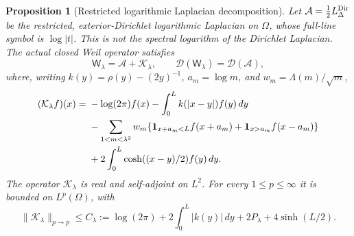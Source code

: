 \documentclass[11pt]{article}
\newtheorem{proposition}[theorem]{Proposition}
\theoremstyle{remark}
\begin{document}
\begin{proposition}[Restricted logarithmic Laplacian decomposition]
\label{prop:v118-log-dirichlet}
Let $\mathcal A=\tfrac12L_\Delta^{\rm Dir}$ be the restricted,
exterior-Dirichlet logarithmic Laplacian on $\Omega$, whose full-line
symbol is $\log|t|$.  This is not the spectral logarithm of the
Dirichlet Laplacian.  The actual closed Weil operator satisfies
\begin{equation}\label{eq:v118-log-decomposition}
 \mathsf W_\lambda=\mathcal A+\mathcal K_\lambda,
 \qquad \mathcal D(\mathsf W_\lambda)=\mathcal D(\mathcal A),
\end{equation}
where, writing $k(y)=\rho(y)-(2y)^{-1}$, $a_m=\log m$, and
$w_m=\Lambda(m)/\sqrt m$,
\begin{align}
 (\mathcal K_\lambda f)(x)={}&-\log(2\pi)f(x)
       -\int_0^L k(|x-y|)f(y)\,dy\notag\\
 &-\sum_{1<m<\lambda^2}w_m
       \{\mathbf1_{x+a_m<L}f(x+a_m)
                   +\mathbf1_{x>a_m}f(x-a_m)\}\notag\\
 &+2\int_0^L\cosh((x-y)/2)f(y)\,dy.
 \label{eq:v118-bounded-physical-part}
\end{align}
The operator $\mathcal K_\lambda$ is real and self-adjoint on $L^2$.
For every $1\le p\le\infty$ it is bounded on $L^p(\Omega)$, with
\begin{equation}\label{eq:v118-K-bound}
 \|\mathcal K_\lambda\|_{p\to p}\le C_\lambda
 :=\log(2\pi)+2\int_0^L|k(y)|\,dy
                  +2P_\lambda+4\sinh(L/2).
\end{equation}
\end{proposition}
\end{document}
